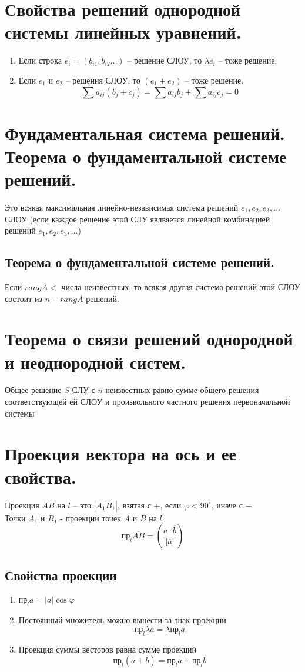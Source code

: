\documentclass[12pt, fleqn]{article}
\begin{document}
\section{Свойства решений однородной системы линейных уравнений.}
\begin{enumerate}
	\item Если строка $e_i = \left(b_{i1}, b_{i2}\dots\right)$ -- решение СЛОУ, то $\lambda e_i$ -- тоже решение.
	\item Если $e_1$ и $e_2$ -- решения СЛОУ, то $\left(e_1 + e_2\right)$ -- тоже решение.
	$$\sum a_{ij}(b_j+c_j)=\sum a_{ij}b_{j}+\sum a_{ij}c_j=0$$
\end{enumerate}
\section{Фундаментальная система решений. Теорема о фундаментальной системе решений.}
Это всякая максимальная линейно-независимая система решений $e_1, e_2, e_3,\dots$ СЛОУ (если каждое решение этой СЛУ явлвяется линейной комбинацией решений $e_1, e_2, e_3, \dots$)
\subsection*{Теорема о фундаментальной системе решений.}
Если $rang A < $ числа неизвестных, то всякая другая система решений этой СЛОУ состоит из $n-rang A$ решений.
\section{Теорема о связи решений однородной и неоднородной систем.}
Общее решение $S$ СЛУ с $n$ неизвестных равно сумме общего решения соответствующей ей СЛОУ и произвольного частного решения первоначальной системы
\section{Проекция вектора на ось и ее свойства.}
Проекция $\overline{AB}$ на $l$ -- это $\left|\overline{A_1B_1}\right|$, взятая с $+$, если $\varphi < 90^\circ$, иначе с $-$.\\
Точки $A_1$ и $B_1$ - проекции точек $A$ и $B$ на $l$.\\
$$\text{пр}_l \overline{AB}=\left(\frac{\overline{a}\cdot\overline{b}}{\left|\overline{a}\right|}\right)$$
\subsection*{Свойства проекции}
\begin{enumerate}
	\item $\text{пр}_l \overline{a}=\left|\overline{a}\right|\cos \varphi$
	\item Постоянный множитель можно вынести за знак проекции  $$\text{пр}_l \lambda\overline{a}=\lambda\text{пр}_l \overline{a}$$
	\item Проекция суммы весторов равна сумме проекций
	$$\text{пр}_l \left(\overline{a}+\overline{b}\right)=\text{пр}_l\overline{a}+\text{пр}_l\overline{b}$$
\end{enumerate}
\end{document}

